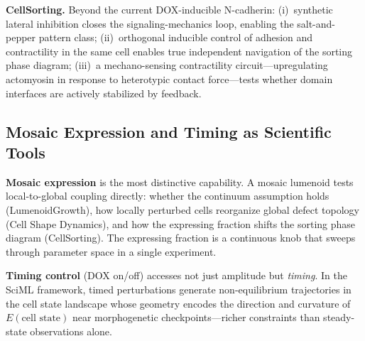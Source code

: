\documentclass[11pt, letterpaper]{article}
\begin{document}
\textbf{CellSorting.} Beyond the current DOX-inducible N-cadherin: (i)~synthetic lateral inhibition closes the signaling-mechanics loop, enabling the salt-and-pepper pattern class; (ii)~orthogonal inducible control of adhesion and contractility in the same cell enables true independent navigation of the sorting phase diagram; (iii)~a mechano-sensing contractility circuit---upregulating actomyosin in response to heterotypic contact force---tests whether domain interfaces are actively stabilized by feedback.

\subsection{Mosaic Expression and Timing as Scientific Tools}

\textbf{Mosaic expression} is the most distinctive capability. A mosaic lumenoid tests local-to-global coupling directly: whether the continuum assumption holds (LumenoidGrowth), how locally perturbed cells reorganize global defect topology (Cell Shape Dynamics), and how the expressing fraction shifts the sorting phase diagram (CellSorting). The expressing fraction is a continuous knob that sweeps through parameter space in a single experiment.

\textbf{Timing control} (DOX on/off) accesses not just amplitude but \textit{timing}. In the SciML framework, timed perturbations generate non-equilibrium trajectories in the cell state landscape whose geometry encodes the direction and curvature of $E(\text{cell state})$ near morphogenetic checkpoints---richer constraints than steady-state observations alone.
\end{document}
